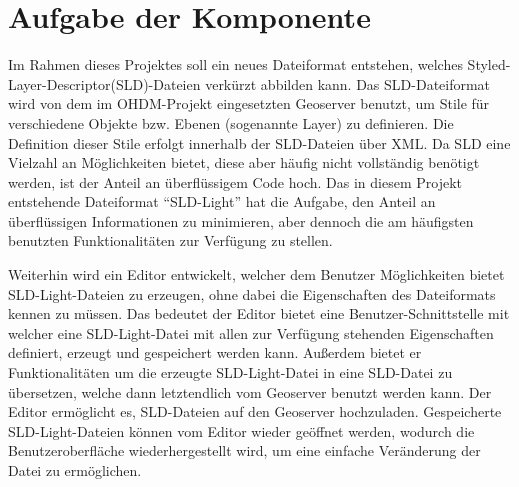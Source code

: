 \section{Aufgabe der Komponente}\label{Aufgabe der Komponente}
Im Rahmen dieses Projektes soll ein neues Dateiformat entstehen, welches Styled-Layer-Descriptor(SLD)-Dateien verkürzt abbilden kann. Das SLD-Dateiformat wird von dem im OHDM-Projekt eingesetzten Geoserver benutzt, um Stile für verschiedene Objekte bzw. Ebenen (sogenannte Layer) zu definieren.  Die Definition dieser Stile erfolgt innerhalb der SLD-Dateien über XML. Da SLD eine Vielzahl an Möglichkeiten bietet, diese aber häufig nicht vollständig benötigt werden, ist der Anteil an überflüssigem Code hoch. Das in diesem Projekt entstehende Dateiformat \enquote{SLD-Light} hat die Aufgabe, den Anteil an überflüssigen Informationen zu minimieren, aber dennoch die am häufigsten benutzten Funktionalitäten zur Verfügung zu stellen.

Weiterhin wird ein Editor entwickelt, welcher dem Benutzer Möglichkeiten bietet SLD-Light-Dateien zu erzeugen, ohne dabei die Eigenschaften des Dateiformats kennen zu müssen. Das bedeutet der Editor bietet eine Benutzer-Schnittstelle mit welcher eine SLD-Light-Datei mit allen zur Verfügung stehenden Eigenschaften definiert, erzeugt und gespeichert werden kann. Außerdem bietet er Funktionalitäten um die erzeugte SLD-Light-Datei in eine SLD-Datei zu übersetzen, welche dann letztendlich vom Geoserver benutzt werden kann. Der Editor ermöglicht es, SLD-Dateien auf den Geoserver hochzuladen. Gespeicherte SLD-Light-Dateien können vom Editor wieder geöffnet werden, wodurch die Benutzeroberfläche wiederhergestellt wird, um eine einfache Veränderung der Datei zu ermöglichen.